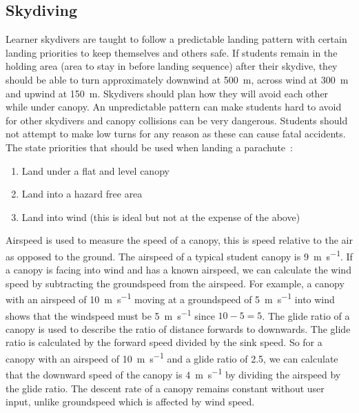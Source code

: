 \documentclass[11pt, twocolumn]{article}
\begin{document}

\subsection{Skydiving}
Learner skydivers are taught to follow a predictable landing pattern with certain landing priorities to keep themselves and others safe. If students remain in the holding area (area to stay in before landing sequence) after their skydive, they should be able to turn approximately downwind at \SI{500}{\metre}, across wind at \SI{300}{\metre} and upwind at \SI{150}{\metre}. Skydivers should plan how they will avoid each other while under canopy. An unpredictable pattern can make students hard to avoid for other skydivers and canopy collisions can be very dangerous. Students should not attempt to make low turns for any reason as these can cause fatal accidents. The \citeauthor{british_parachute_association_chmanual.pdf_nodate} state priorities that should be used when landing a parachute~\cite{british_parachute_association_chmanual.pdf_nodate}:

\begin{enumerate}
    \item Land under a flat and level canopy
    \item Land into a hazard free area
    \item Land into wind (this is ideal but not at the expense of the above)
\end{enumerate}


Airspeed is used to measure the speed of a canopy, this is speed relative to the air as opposed to the ground. The airspeed of a typical student canopy is \SI{9}{\metre\per\second}. If a canopy is facing into wind and has a known airspeed, we can calculate the wind speed by subtracting the groundspeed from the airspeed. For example, a canopy with an airspeed of \SI{10}{\metre\per\second} moving at a groundspeed of \SI{5}{\metre\per\second} into wind shows that the windspeed must be \SI{5}{\metre\per\second} since $10 - 5 = 5$.
The glide ratio of a canopy is used to describe the ratio of distance forwards to downwards. The glide ratio is calculated by the forward speed divided by the sink speed. So for a canopy with an airspeed of \SI{10}{\metre\per\second} and a glide ratio of 2.5, we can calculate that the downward speed of the canopy is \SI{4}{\metre\per\second} by dividing the airspeed by the glide ratio. The descent rate of a canopy remains constant without user input, unlike groundspeed which is affected by wind speed.
\end{document}
